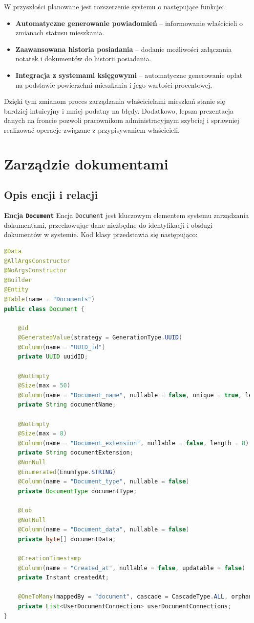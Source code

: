 W przyszłości planowane jest rozszerzenie systemu o następujące funkcje:
\begin{itemize}
    \item \textbf{Automatyczne generowanie powiadomień} -- informowanie właścicieli o zmianach statusu mieszkania.
    \item \textbf{Zaawansowana historia posiadania} -- dodanie możliwości załączania notatek i dokumentów do historii posiadania.
    \item \textbf{Integracja z systemami księgowymi} -- automatyczne generowanie opłat na podstawie powierzchni mieszkania i jego wartości procentowej.
\end{itemize}

Dzięki tym zmianom proces zarządzania właścicielami mieszkań stanie się bardziej intuicyjny i mniej podatny na błędy. Dodatkowo, lepsza prezentacja danych na froncie pozwoli pracownikom administracyjnym szybciej i sprawniej realizować operacje związane z przypisywaniem właścicieli.


\section{Zarządzie dokumentami}

\subsection{Opis encji i relacji}

\textbf{Encja \texttt{Document}}  
Encja \texttt{Document} jest kluczowym elementem systemu zarządzania dokumentami, przechowując dane niezbędne do identyfikacji i obsługi dokumentów w systemie. Kod klasy przedstawia się następująco:

\begin{lstlisting}[language=Java, style=JavaStyle, caption=Encja \texttt{Document}]
@Data
@AllArgsConstructor
@NoArgsConstructor
@Builder
@Entity
@Table(name = "Documents")
public class Document {

    @Id
    @GeneratedValue(strategy = GenerationType.UUID)
    @Column(name = "UUID_id")
    private UUID uuidID; 

    @NotEmpty
    @Size(max = 50)
    @Column(name = "Document_name", nullable = false, unique = true, length = 50)
    private String documentName; 

    @NotEmpty
    @Size(max = 8)
    @Column(name = "Document_extension", nullable = false, length = 8)
    private String documentExtension;
    @NonNull
    @Enumerated(EnumType.STRING)
    @Column(name = "Document_type", nullable = false)
    private DocumentType documentType; 

    @Lob
    @NotNull
    @Column(name = "Document_data", nullable = false)
    private byte[] documentData;

    @CreationTimestamp
    @Column(name = "Created_at", nullable = false, updatable = false)
    private Instant createdAt; 

    @OneToMany(mappedBy = "document", cascade = CascadeType.ALL, orphanRemoval = true)
    private List<UserDocumentConnection> userDocumentConnections; 
}
\end{lstlisting}

